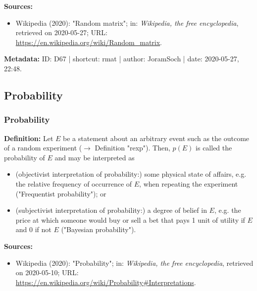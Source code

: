 \documentclass[a4paper,12pt,twoside]{book}
\begin{document}
\vspace{1em}
\textbf{Sources:}
\begin{itemize}
\item Wikipedia (2020): "Random matrix"; in: \textit{Wikipedia, the free encyclopedia}, retrieved on 2020-05-27; URL: \url{https://en.wikipedia.org/wiki/Random_matrix}.
\end{itemize}


\vspace{1em}
\textbf{Metadata:} ID: D67 | shortcut: rmat | author: JoramSoch | date: 2020-05-27, 22:48.
\vspace{1em}



\subsection{Probability}

\subsubsection[\textit{Probability}]{Probability} \label{sec:prob}
\setcounter{equation}{0}

\textbf{Definition:} Let $E$ be a statement about an arbitrary event such as the outcome of a random experiment ($\rightarrow$ Definition "rexp"). Then, $p(E)$ is called the probability of $E$ and may be interpreted as

\begin{itemize}

\item (objectivist interpretation of probability:) some physical state of affairs, e.g. the relative frequency of occurrence of $E$, when repeating the experiment ("Frequentist probability"); or

\item (subjectivist interpretation of probability:) a degree of belief in $E$, e.g. the price at which someone would buy or sell a bet that pays 1 unit of utility if $E$ and 0 if not $E$ ("Bayesian probability").

\end{itemize}


\vspace{1em}
\textbf{Sources:}
\begin{itemize}
\item Wikipedia (2020): "Probability"; in: \textit{Wikipedia, the free encyclopedia}, retrieved on 2020-05-10; URL: \url{https://en.wikipedia.org/wiki/Probability#Interpretations}.
\end{itemize}
\end{document}
